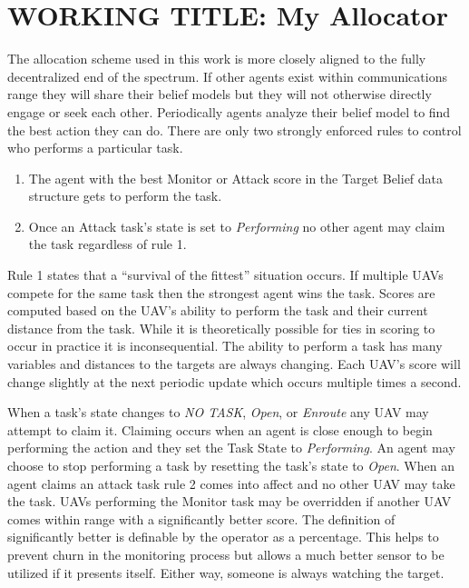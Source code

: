\section{WORKING TITLE: My Allocator}

The allocation scheme used in this work is more closely aligned to the fully decentralized end of the spectrum.  If other agents exist within communications range they will share their belief models but they will not otherwise directly engage or seek each other.  Periodically agents analyze their belief model to find the best action they can do.  There are only two strongly enforced rules to control who performs a particular task.  

\begin{enumerate}
	\item The agent with the best Monitor or Attack score in the Target Belief data structure gets to perform the task.
	\item Once an Attack task's state is set to \textit{Performing} no other agent may claim the task regardless of rule 1.
\end{enumerate}

Rule 1 states that a ``survival of the fittest'' situation occurs.  If multiple UAVs compete for the same task then the strongest agent wins the task.  Scores are computed based on the UAV's ability to perform the task and their current distance from the task.  While it is theoretically possible for ties in scoring to occur in practice it is inconsequential.  The ability to perform a task has many variables and distances to the targets are always changing.  Each UAV's score will change slightly at the next periodic update which occurs multiple times a second.

When a task's state changes to \textit{NO TASK}, \textit{Open}, or \textit{Enroute} any UAV may attempt to claim it.  Claiming occurs when an agent is close enough to begin performing the action and they set the Task State to \textit{Performing}.  An agent may choose to stop performing a task by resetting the task's state to \textit{Open}.  When an agent claims an attack task rule 2 comes into affect and no other UAV may take the task.  UAVs performing the Monitor task may be overridden if another UAV comes within range with a significantly better score.  The definition of significantly better is definable by the operator as a percentage.   This helps to prevent churn in the monitoring process but allows a much better sensor to be utilized if it presents itself.  Either way, someone is always watching the target.

